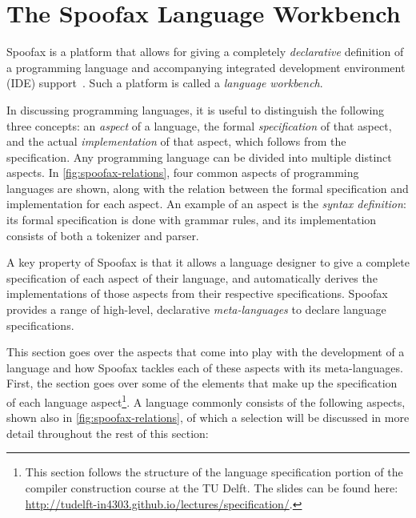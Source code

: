 \section{The Spoofax Language Workbench}
\label{sec:spoofax}
Spoofax is a platform that allows for giving a completely \emph{declarative}
definition of a programming language and accompanying integrated development
environment (IDE) support~\cite{Kats10a}. Such a platform is called a
\emph{language workbench}.

In discussing programming languages, it is useful to distinguish the following
three concepts: an \textit{aspect} of a language, the formal
\textit{specification} of that aspect, and the actual \textit{implementation} of
that aspect, which follows from the specification. Any programming language can
be divided into multiple distinct aspects. In \cref{fig:spoofax-relations}, four
common aspects of programming languages are shown, along with the relation
between the formal specification and implementation for each aspect. An example
of an aspect is the \textit{syntax definition}: its formal specification is done
with grammar rules, and its implementation consists of both a tokenizer and
parser.

A key property of Spoofax is that it allows a language designer to give a
complete specification of each aspect of their language, and automatically
derives the implementations of those aspects from their respective
specifications. Spoofax provides a range of high-level, declarative
\textit{meta-languages} to declare language specifications.

This section goes over the aspects that come into play with the development of a
language and how Spoofax tackles each of these aspects with its
meta-languages. First, the section goes over some of the elements that make up
the specification of each language aspect\footnote{This section follows the
  structure of the language specification portion of the compiler construction
  course at the TU Delft. The slides can be found here:
  \url{http://tudelft-in4303.github.io/lectures/specification/}.}. A language
commonly consists of the following aspects, shown also in
\cref{fig:spoofax-relations}, of which a selection will be discussed in more
detail throughout the rest of this section:

